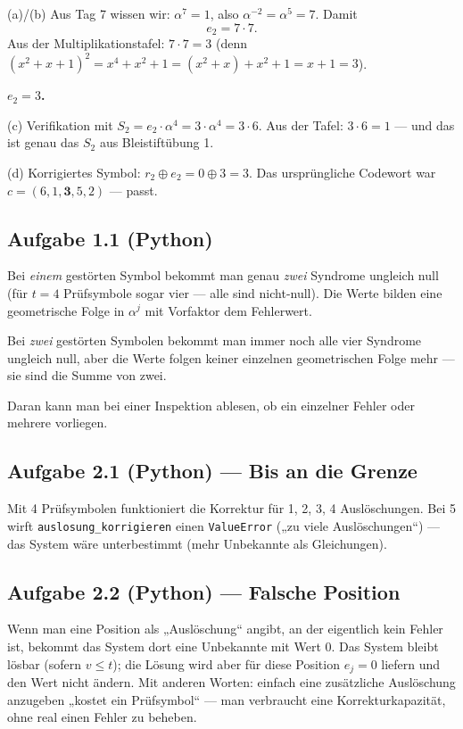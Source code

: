 (a)/(b) Aus Tag 7 wissen wir: $\alpha^7 = 1$, also $\alpha^{-2} =
\alpha^5 = 7$. Damit
\[
  e_2 = 7 \cdot 7.
\]
Aus der Multiplikationstafel: $7 \cdot 7 = 3$ (denn
$(x^2+x+1)^2 = x^4+x^2+1 = (x^2+x)+x^2+1 = x+1 = 3$).

\textbf{$e_2 = 3$.}

(c) Verifikation mit $S_2 = e_2 \cdot \alpha^4 = 3 \cdot \alpha^4 =
3 \cdot 6$. Aus der Tafel: $3 \cdot 6 = 1$ — und das ist genau das
$S_2$ aus Bleistiftübung 1. \checkmark

(d) Korrigiertes Symbol: $r_2 \oplus e_2 = 0 \oplus 3 = 3$. Das
ursprüngliche Codewort war $c = (6, 1, \mathbf{3}, 5, 2)$ — passt.

\subsection*{Aufgabe 1.1 (Python)}

Bei \emph{einem} gestörten Symbol bekommt man genau \emph{zwei}
Syndrome ungleich null (für $t = 4$ Prüfsymbole sogar vier — alle
sind nicht-null). Die Werte bilden eine geometrische Folge in
$\alpha^j$ mit Vorfaktor dem Fehlerwert.

Bei \emph{zwei} gestörten Symbolen bekommt man immer noch alle vier
Syndrome ungleich null, aber die Werte folgen keiner einzelnen
geometrischen Folge mehr — sie sind die Summe von zwei.

Daran kann man bei einer Inspektion ablesen, ob ein einzelner Fehler
oder mehrere vorliegen.

\subsection*{Aufgabe 2.1 (Python) — Bis an die Grenze}

Mit 4 Prüfsymbolen funktioniert die Korrektur für 1, 2, 3, 4
Auslöschungen. Bei 5 wirft \texttt{auslosung\_korrigieren} einen
\texttt{ValueError} („zu viele Auslöschungen“) — das System wäre
unterbestimmt (mehr Unbekannte als Gleichungen).

\subsection*{Aufgabe 2.2 (Python) — Falsche Position}

Wenn man eine Position als „Auslöschung“ angibt, an der eigentlich
kein Fehler ist, bekommt das System dort eine Unbekannte mit Wert 0.
Das System bleibt lösbar (sofern $v \le t$); die Lösung wird aber
für diese Position $e_j = 0$ liefern und den Wert nicht ändern. Mit
anderen Worten: einfach eine zusätzliche Auslöschung anzugeben „kostet
ein Prüfsymbol“ — man verbraucht eine Korrekturkapazität, ohne real
einen Fehler zu beheben.


